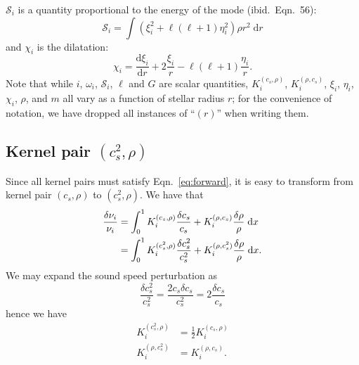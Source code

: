 \documentclass[twocolumn,twocolappendix]{aastex6}
\newcommand{\Ltwo}{\ell(\ell+1)}
\newcommand{\ddra}[1]{\frac{\text{d} #1}{\text{d}r}}
\newcommand{\Kcr}{K_i^{(c_s, \rho)}}
\newcommand{\Krc}{K_i^{(\rho, c_s)}}
\newcommand{\Kcsr}{K_i^{(c_s^2, \rho)}}
\newcommand{\Krcs}{K_i^{(\rho, c_s^2)}}
\begin{document}
$\mathcal{S}_i$ is a quantity proportional to the energy of the mode (ibid.\ Eqn.\ 56):
\begin{equation}
    \mathcal{S}_i = \int \left( \xi_i^2 + \Ltwo \eta_i^2 \right) \rho r^2 \; \text{d}r
\end{equation}
and $\chi_i$ is the dilatation:
\begin{equation}
    \chi_i = \ddra{\xi_i} + 2\frac{\xi_i}{r} - \Ltwo \frac{\eta_i}{r}.
\end{equation}
Note that while $i$, $\omega_i$, $\mathcal{S}_i$, $\ell$ and $G$ are scalar quantities, $\Kcr$, $\Krc$, $\xi_i$, $\eta_i$, $\chi_i$, $\rho$, and $m$ all vary as a function of stellar radius $r$; for the convenience of notation, we have dropped all instances of ``$(r)$'' when writing them. 

\subsection{Kernel pair \texorpdfstring{$(c_s^2, \rho)$}{(cs2,rho)}}
Since all kernel pairs must satisfy Eqn.\ \ref{eq:forward}, it is easy to transform from kernel pair $(c_s, \rho)$ to $(c_s^2, \rho)$. We have that
\begin{align}
    \frac{\delta\nu_i}{\nu_i} 
    &= 
    \int_0^1 K^{(c_s,\rho)}_i \frac{\delta c_s}{c_s} + K^{(\rho,c_s)}_i \frac{\delta \rho}{\rho} \; \text{d}x
\notag\\&=
    \int_0^1 K^{(c_s^2,\rho)}_i \frac{\delta c_s^2}{c_s^2} + K^{(\rho,c_s^2)}_i \frac{\delta \rho}{\rho} \; \text{d}x.
\end{align}
We may expand the sound speed perturbation as
\begin{equation}
    \frac{\delta c_s^2}{c_s^2} = \frac{2 c_s\delta c_s}{c_s^2} = 2 \frac{\delta c_s}{c_s}
\end{equation}
hence we have
\begin{align}
    \Kcsr &= \frac{1}{2} \Kcr \label{eq:Kcsr}
\\  \Krcs &= \Krc. \label{eq:Krcs}
\end{align}
\end{document}
